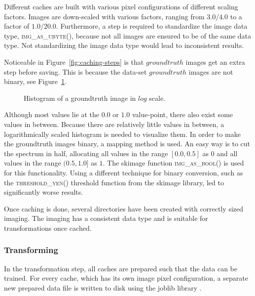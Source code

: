 Different caches are built with various pixel configurations of different scaling factors. Images are down-scaled with various factors, ranging from $3.0/4.0$ to a factor of $1.0/20.0$. Furthermore, a step is required to standardize the image data type, \textsc{img\_as\_ubyte()}, because not all images are ensured to be of the same data type. Not standardizing the image data type would lead to inconsistent results.

Noticeable in Figure~\ref{fig:caching-steps} is that $groundtruth$ images get an extra step before saving. This is because the data-set $groundtruth$ images are not binary, see Figure~\ref{fig:gt-histogram}.

\begin{figure}[ht]
  \centering
  
  \caption{Histogram of a groundtruth image in $log$ scale.
  }\label{fig:gt-histogram}
\end{figure}

Although most values lie at the $0.0$ or $1.0$ value-point, there also exist some values in between. Because there are relatively little values in between, a logarithmically scaled histogram is needed to visualize them. In order to make the groundtruth images binary, a mapping method is used. An easy way is to cut the spectrum in half, allocating all values in the range $[0.0, 0.5]$ as $0$ and all values in the range $(0.5, 1.0]$ as $1$. The skimage function \textsc{img\_as\_bool()} is used for this functionality. Using a different technique for binary conversion, such as the \textsc{threshold\_yen()} threshold function from the skimage library, led to significantly worse results.

Once caching is done, several directories have been created with correctly sized imaging. The imaging has a consistent data type and is suitable for transformations once cached.

\subsubsection{Transforming}\label{sec:method_transforming}
In the transformation step, all caches are prepared such that the data can be trained. For every cache, which has its own image pixel configuration, a separate new prepared data file is written to disk using the joblib library \citep{varoquaux2009joblib}.

